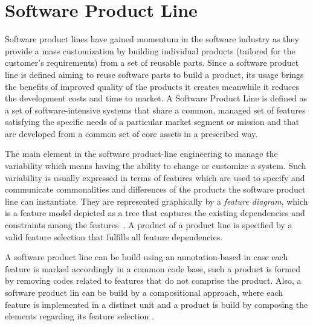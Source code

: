 \section{Software Product Line \label{sec:softwareProductLine}}

 Software product lines have gained momentum in the software industry as they
 provide a mass customization by building individual products (tailored for the
 customer's requirements) from a set of reusable parts. Since a software product
 line is defined aiming to reuse software parts to build a product, its usage
 brings the benefits of improved quality of the products it creates meanwhile it
 reduces the development costs and time to market. A Software Product Line is defined as a set of software-intensive systems that share
a common, managed set of features satisfying the specific needs of a particular market
segment or mission and that are developed from a common set of core assets in a prescribed
way\cite{clements_software_2002}. 


The main element in the software product-line engineering to manage the
variability which means having the ability to change or customize a
system\cite{linden_software_2007}. Such variability is usually expressed in terms of features which are used to specify and communicate commonalities and differences of
 the products the software product line can instantiate. They are represented
 graphically by a \textit{feature diagram}, which is a  feature model\cite{czarnecki_generative_2000, kang_1990} depicted
 as a tree that captures the existing dependencies and constraints among the
 features~\cite{apel_feature-oriented_2013}. A product of a product line is
 specified by a valid feature selection that fulfills all feature dependencies.

 A software product line can be build using an annotation-based in case each
 feature is marked accordingly in a common code base, such a product is formed
 by removing codes related to features that do not comprise the product. Also, a
 software product lin can be build by a compositional approach, where each
 feature is implemented in a distinct unit and a product is build by composing
 the elements regarding its feature selection \cite{Kastner_2008}.


